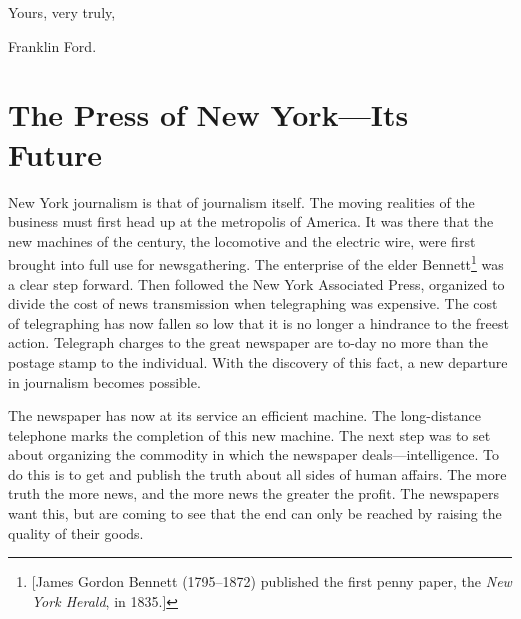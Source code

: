 \documentclass[openany,nobib]{tufte-book}
\let\oldchapter\chapter
\def\chapter{%
  \setcounter{footnote}{0}%
  \oldchapter
}
\begin{document}
\vspace{.15in}

\hfill Yours, very truly,~

\vspace{.05in}

\hfill Franklin Ford.~



\chapter[The Press of New York---Its Future]{The Press of New York---Its Future}
\label{ch:The Press of New York---Its Future}

\vspace{.2in}

\begin{LARGE}


\end{LARGE}

\vspace{0.5in}

 New York journalism is that of journalism itself. The
moving realities of the business must first head up at the metropolis of
America. It was there that the new machines of the century, the
locomotive and the electric wire, were first brought into full use for
newsgathering. The enterprise of the elder Bennett\footnote{{[}James
  Gordon Bennett (1795--1872) published the first penny paper, the
  \emph{New York Herald}, in 1835.{]}} was a clear step forward. Then
followed the New York Associated Press, organized to divide the cost of
news transmission when telegraphing was expensive. The cost of
telegraphing has now fallen so low that it is no longer a hindrance to
the freest action. Telegraph charges to the great newspaper are to-day
no more than the postage stamp to the individual. With the discovery of
this fact, a new departure in journalism becomes possible.~

The newspaper has now at its service an efficient machine. The
long-distance telephone marks the completion of this new machine. The
next step was to set about organizing the commodity in which the
newspaper deals---intelligence. To do this is to get and publish the
truth about all sides of human affairs. The more truth the more news,
and the more news the greater the profit. The newspapers want this, but
are coming to see that the end can only be reached by raising the
quality of their goods.~
\end{document}
